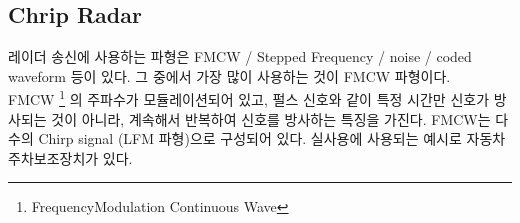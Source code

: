 \subsection{Chrip Radar}
레이더 송신에 사용하는 파형은  FMCW / Stepped Frequency / noise / coded waveform 등이 있다. 그 중에서 가장 많이 사용하는 것이 FMCW 파형이다.\\
FMCW \footnote{FrequencyModulation Continuous Wave} 의 주파수가 모듈레이션되어 있고, 펄스 신호와 같이 특정 시간만 신호가 방사되는 것이 아니라, 계속해서 반복하여 신호를 방사하는 특징을 가진다.  FMCW는 다수의 Chirp signal (LFM 파형)으로 구성되어 있다. 실사용에 사용되는 예시로 자동차 주차보조장치가 있다. 